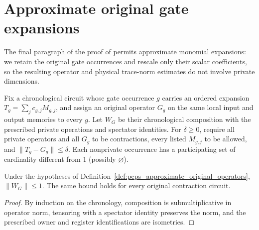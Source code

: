 \section{Approximate original gate expansions}
\label{sec:peps_approximate_original_gates}

The final paragraph of the proof of
\cite[Theorem~5.2]{OpenAI2026PolynomialPEPS} permits approximate
monomial expansions: we retain the original gate occurrences and rescale
only their scalar coefficients, so the resulting operator and physical
trace-norm estimates do not involve private dimensions.

\begin{definition}
    \label{def:peps_approximate_original_operators}
    \leanok
    Fix a chronological circuit whose gate occurrence $g$ carries an
    ordered expansion $T_g=\sum_j c_{g,j}M_{g,j}$, and assign an original
    operator $G_g$ on the same local input and output memories to every $g$.
    Let $W_G$ be their chronological composition with the prescribed private
    operations and spectator identities. For $\delta\ge0$, require all private
    operators and all $G_g$ to be contractions, every listed $M_{g,j}$ to be
    allowed, and $\|T_g-G_g\|\le\delta$. Each nonprivate occurrence has a
    participating set of cardinality different from $1$ (possibly $\varnothing$).
\end{definition}

\begin{lemma}
    \label{thm:peps_original_operator_contraction}
    \leanok
    Under the hypotheses of Definition~\ref{def:peps_approximate_original_operators},
    $\|W_G\|\le1$. The same bound holds for every original contraction circuit.
\end{lemma}
\begin{proof}
    \leanok
    By induction on the chronology, composition is submultiplicative in operator
    norm, tensoring with a spectator identity preserves the norm, and the
    prescribed owner and register identifications are isometries.
\end{proof}

